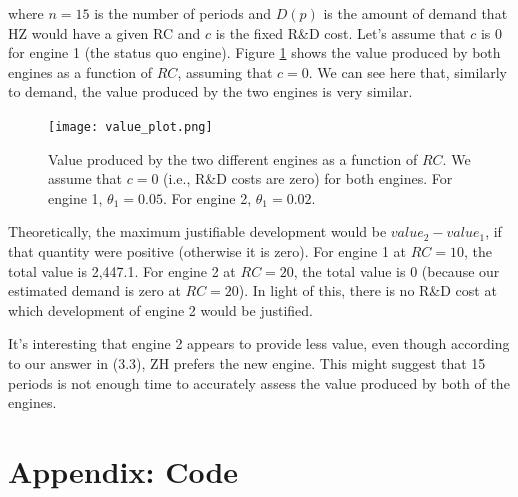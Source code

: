 \documentclass[paper=a4, fontsize=11pt]{scrartcl} %
\numberwithin{equation}{section} %
\numberwithin{figure}{section} %
\numberwithin{table}{section} %
\newcommand{\mylisting}[2][]{%
}
\begin{document}
\begin{itemize}
\begin{itemize}
\noindent where $n=15$ is the number of periods and $D(p)$ is the amount of demand that HZ would have a given RC and $c$ is the fixed R\&D cost. Let's assume that $c$ is 0 for engine 1 (the status quo engine). Figure \ref{fig:value_plot} shows the value produced by both engines as a function of $RC$, assuming that $c = 0$. We can see here that, similarly to demand, the value produced by the two engines is very similar.

\begin{figure}[ht!]
\centering
	\texttt{[image: value\_plot.png]}
\caption{Value produced by the two different engines as a function of $RC$. We assume that $c = 0$ (i.e., R\&D costs are zero) for both engines. For engine 1, $\theta_1 = 0.05$. For engine 2, $\theta_1 = 0.02$.}
\label{fig:value_plot}
\end{figure}

Theoretically, the maximum justifiable development would be $value_2 - value_1$, if that quantity were positive (otherwise it is zero). For engine 1 at $RC = 10$, the total value is 2,447.1. For engine 2 at $RC = 20$, the total value is 0 (because our estimated demand is zero at $RC=20$). In light of this, there is no R\&D cost at which development of engine 2 would be justified. 

It's interesting that engine 2 appears to provide less value, even though according to our answer in (3.3), ZH prefers the new engine. This might suggest that 15 periods is not enough time to accurately assess the value produced by both of the engines.

\end{itemize}

\end{itemize}

\newpage
\section*{Appendix: Code}

\mylisting[language=R]{./rust.R}



\end{document}
